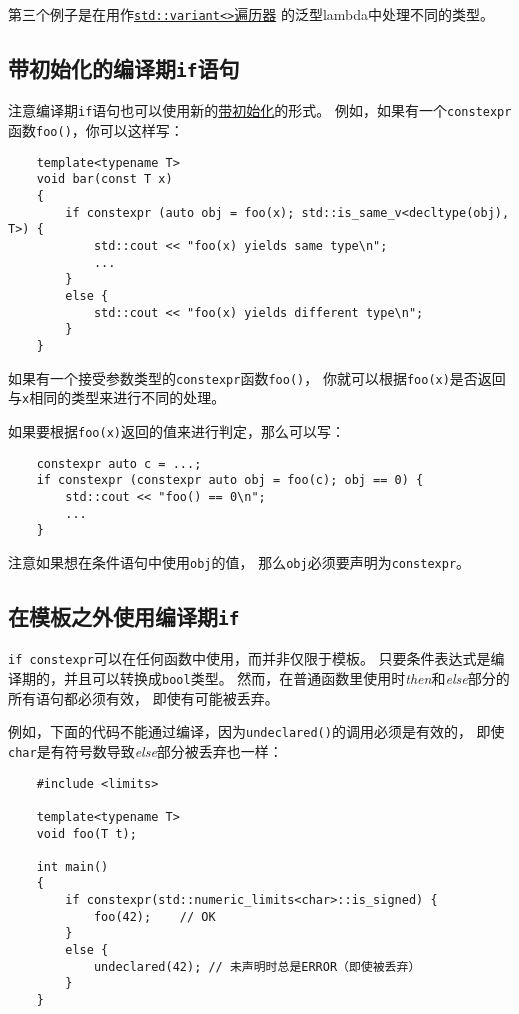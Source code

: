 第三个例子是在用作\hyperref[ch16.3.3.2]{\texttt{std::variant<>}遍历器}
的泛型lambda中处理不同的类型。

\subsection{带初始化的编译期\texttt{if}语句}
注意编译期\texttt{if}语句也可以使用新的\hyperref[ch2]{带初始化}的形式。
例如，如果有一个\texttt{constexpr}函数\texttt{foo()}，你可以这样写：
\begin{lstlisting}
    template<typename T>
    void bar(const T x)
    {
        if constexpr (auto obj = foo(x); std::is_same_v<decltype(obj), T>) {
            std::cout << "foo(x) yields same type\n";
            ...
        }
        else {
            std::cout << "foo(x) yields different type\n";
        }
    }
\end{lstlisting}
如果有一个接受参数类型的\texttt{constexpr}函数\texttt{foo()}，
你就可以根据\texttt{foo(x)}是否返回与\texttt{x}相同的类型来进行不同的处理。

如果要根据\texttt{foo(x)}返回的值来进行判定，那么可以写：
\begin{lstlisting}
    constexpr auto c = ...;
    if constexpr (constexpr auto obj = foo(c); obj == 0) {
        std::cout << "foo() == 0\n";
        ...
    }
\end{lstlisting}
注意如果想在条件语句中使用\texttt{obj}的值，
那么\texttt{obj}必须要声明为\texttt{constexpr}。

\subsection{在模板之外使用编译期\texttt{if}}
\texttt{if constexpr}可以在任何函数中使用，而并非仅限于模板。
只要条件表达式是编译期的，并且可以转换成\texttt{bool}类型。
然而，在普通函数里使用时\emph{then}和\emph{else}部分的所有语句都必须有效，
即使有可能被丢弃。

例如，下面的代码不能通过编译，因为\texttt{undeclared()}的调用必须是有效的，
即使\texttt{char}是有符号数导致\emph{else}部分被丢弃也一样：
\begin{lstlisting}
    #include <limits>

    template<typename T>
    void foo(T t);

    int main()
    {
        if constexpr(std::numeric_limits<char>::is_signed) {
            foo(42);    // OK
        }
        else {
            undeclared(42); // 未声明时总是ERROR（即使被丢弃）
        }
    }
\end{lstlisting}

